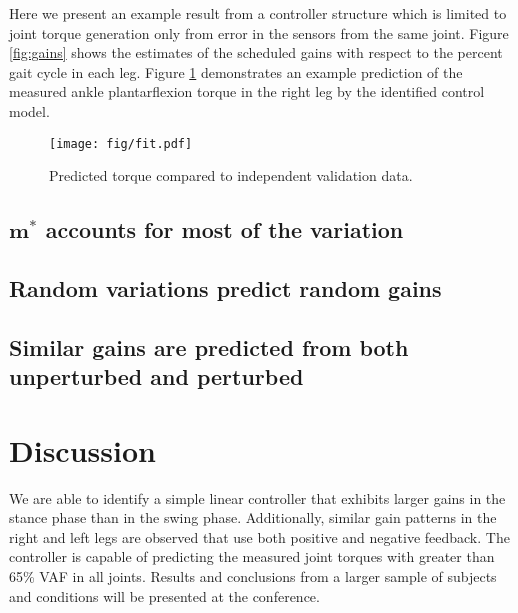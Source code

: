 \documentclass{article}
\begin{document}
Here we present an example result from a controller structure which is limited
to joint torque generation only from error in the sensors from the same joint.
Figure \ref{fig:gains} shows the estimates of the scheduled gains with respect
to the percent gait cycle in each leg. Figure \ref{fig:fit} demonstrates an
example prediction of the measured ankle plantarflexion torque in the right leg
by the identified control model.
%
\begin{figure}[b]
  \begin{center}
    \texttt{[image: fig/fit.pdf]}
    \caption{Predicted torque compared to independent validation data.}
    \label{fig:fit}
  \end{center}
\end{figure}
%
\subsection*{$\mathbf{m}^*$ accounts for most of the variation}
%
\subsection*{Random variations predict random gains}
%
\subsection*{Similar gains are predicted from both unperturbed and perturbed}
%
\section*{Discussion}
%
We are able to identify a simple linear controller that exhibits larger gains
in the stance phase than in the swing phase. Additionally, similar gain
patterns in the right and left legs are observed that use both positive and
negative feedback. The controller is capable of predicting the measured joint
torques with greater than 65\% VAF in all joints. Results and conclusions from
a larger sample of subjects and conditions will be presented at the conference.

%
\end{document}
